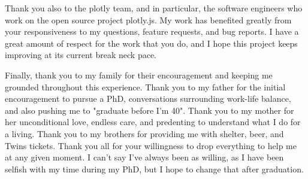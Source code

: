 Thank you also to the plotly team, and in particular, the software engineers who work on the open source project plotly.js. My work has benefited greatly from your responsiveness to my questions, feature requests, and bug reports. I have a great amount of respect for the work that you do, and I hope this project keeps improving at its current break neck pace.

Finally, thank you to my family for their encouragement and keeping me grounded throughout this experience. Thank you to my father for the initial encouragement to pursue a PhD, conversations surrounding work-life balance, and also pushing me to "graduate before I'm 40". Thank you to my mother for her unconditional love, endless care, and predenting to understand what I do for a living. Thank you to my brothers for providing me with shelter, beer, and Twins tickets. Thank you all for your willingness to drop everything to help me at any given moment. I can't say I've always been as willing, as I have been selfish with my time during my PhD, but I hope to change that after graduation.

